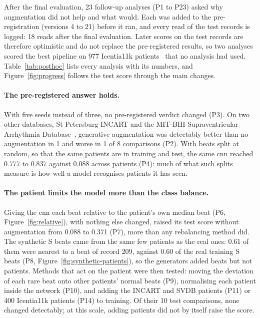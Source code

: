 After the final evaluation, 23 follow-up analyses (P1 to P23) asked why augmentation did not help and what would. Each was added to the pre-registration (versions 4 to 21) before it ran, and every read of the test records is logged: 18 reads after the final evaluation. Later scores on the test records are therefore optimistic and do not replace the pre-registered results, so two analyses scored the best pipeline on 977 Icentia11k patients~\cite{tan2022icentia} that no analysis had used. Table~\ref{tab:posthoc} lists every analysis with its numbers, and Figure~\ref{fig:progress} follows the test score through the main changes.

\paragraph{The pre-registered answer holds.} With five seeds instead of three, no pre-registered verdict changed (P3). On two other databases, St Petersburg INCART and the MIT-BIH Supraventricular Arrhythmia Database~\cite{goldberger2000}, generative augmentation was detectably better than no augmentation in 1 and worse in 1 of 8 comparisons (P2). With beats split at random, so that the same patients are in training and test, the same cnn reached 0.777 to 0.837 against 0.088 across patients (P4): much of what such splits measure is how well a model recognises patients it has seen.

\paragraph{The patient limits the model more than the class balance.} Giving the cnn each beat relative to the patient's own median beat (P6, Figure~\ref{fig:relative}), with nothing else changed, raised its test score without augmentation from 0.088 to 0.371 (P7), more than any rebalancing method did. The synthetic S beats came from the same few patients as the real ones: 0.61 of them were nearest to a beat of record 209, against 0.60 of the real training S beats (P8, Figure~\ref{fig:synthetic-patients}), so the generators added beats but not patients. Methods that act on the patient were then tested: moving the deviation of each rare beat onto other patients' normal beats (P9), normalising each patient inside the network (P10), and adding the INCART and SVDB patients (P11) or 400 Icentia11k patients (P14) to training. Of their 10 test comparisons, none changed detectably; at this scale, adding patients did not by itself raise the score.

